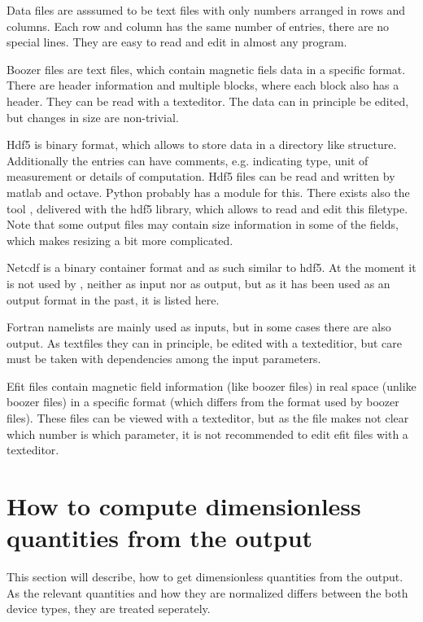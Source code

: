 Data files are asssumed to be text files with only numbers arranged in
rows and columns. Each row and column has the same number of entries,
there are no special lines.
They are easy to read and edit in almost any program.

Boozer files are text files, which contain magnetic fiels data in a
specific format. There are header information and multiple blocks, where
each block also has a header.
They can be read with a texteditor. The data can in principle be edited,
but changes in size are non-trivial.

Hdf5 is binary format, which allows to store data in a directory like
structure. Additionally the entries can have comments, e.g. indicating
type, unit of measurement or details of computation.
Hdf5 files can be read and written by matlab and octave. Python probably
has a module for this. There exists also the tool ,
delivered with the hdf5 library, which allows to read and edit this
filetype.
Note that some output files may contain size information in some of the
fields, which makes resizing a bit more complicated.

Netcdf is a binary container format and as such similar to hdf5. At the
moment it is not used by \neotwo, neither as input nor as output, but as
it has been used as an output format in the past, it is listed here.

Fortran namelists are mainly used as inputs, but in some cases there are
also output. As textfiles they can in principle, be edited with a
texteditior, but care must be taken with dependencies among the input
parameters.

Efit files contain magnetic field information (like boozer files) in
real space (unlike boozer files) in a specific format (which differs
from the format used by boozer files). These files can be viewed with
a texteditor, but as the file makes not clear which number is which
parameter, it is not recommended to edit efit files with a texteditor.

\section{How to compute dimensionless quantities from the output}
This section will describe, how to get dimensionless quantities from the
\neotwo output. As the relevant quantities and how they are normalized
differs between the both device types, they are treated seperately.

